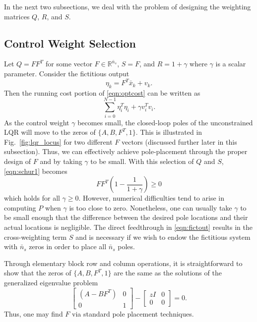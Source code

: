 \documentclass[twocolumn,twoside]{IEEEtran}
\newcommand{\xd}{\ensuremath{\bar x }\xspace}
\begin{document}
In the next two subsections, we deal with the problem of designing the weighting matrices $Q$, $R$, and $S$.

\subsection{Control Weight Selection}
Let $Q = FF^T$ for some vector $F\in\mathds{R}^{\bar{n}_s}$, $S=F$, and $R=1+\gamma$ where $\gamma$ is a scalar parameter. Consider the fictitious output
\begin{equation}
  \eta_k = F^T\xd_k + v_k. \label{eqn:fictout}
\end{equation}
Then the running cost portion of \eqref{eqn:optcost} can be written as
\begin{equation}
   \sum_{i=0}^{N-1} \eta_i^T\eta_i + \gamma v_i^T v_i.
\end{equation}
As the control weight $\gamma$ becomes small, the closed-loop poles of the unconstrained LQR
will move to the zeros of $\{A, B, F^T, 1\}$. This is illustrated in Fig.~\ref{fig:lqr_locus} for two different $F$ vectors (discussed further later in this subsection). Thus, we can effectively achieve pole-placement through the proper design of $F$ and by taking $\gamma$ to be small.
With this selection of $Q$ and $S$, \eqref{eqn:schur1} becomes
\begin{equation}
FF^T\left(1 - \frac{1}{1+\gamma} \right)\geq 0
\end{equation}
which holds for all $\gamma\geq 0$. However, numerical difficulties tend to arise in computing $P$ when $\gamma$ is too close to zero. Nonetheless, one can usually take $\gamma$ to be small enough that the difference between the desired pole locations and their actual locations is negligible. The direct feedthrough in \eqref{eqn:fictout} results in the cross-weighting term $S$ and is necessary if we wish to endow the fictitious system with $\bar{n}_s$ zeros in order to place all $\bar{n}_s$ poles.

Through elementary block row and column operations, it is straightforward to show that the zeros of
$\{A, B, F^T, 1\}$ are the same as the solutions of the generalized eigenvalue problem
\begin{equation*}
  \begin{bmatrix}
    (A - BF^T) & 0\\
    0 & 1
  \end{bmatrix} - \begin{bmatrix}zI & 0\\0 & 0\end{bmatrix} = 0.
\end{equation*}
Thus, one may find $F$ via standard pole placement techniques.
\end{document}

